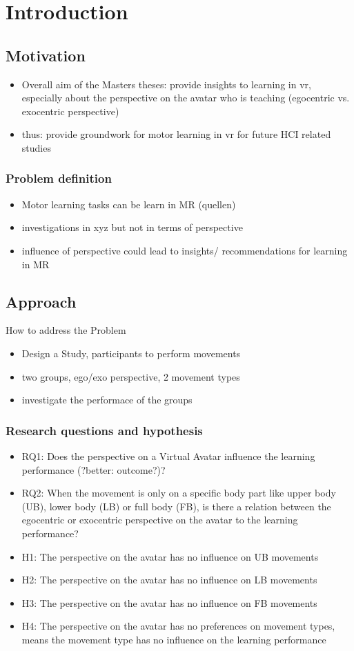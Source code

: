 \chapter{Introduction}
\section{Motivation}
\begin{itemize}
	\item Overall aim of the Masters theses: provide insights to learning in vr, especially about the perspective on the avatar who is teaching (egocentric vs. exocentric perspective)	
	\item thus: provide groundwork for motor learning in vr for future HCI related studies
\end{itemize}
\subsection{Problem definition}
\begin{itemize}
	\item Motor learning tasks can be learn in MR (quellen)
	\item investigations in xyz but not in terms of perspective
	\item influence of perspective could lead to insights/ recommendations for learning in MR
\end{itemize}
\section{Approach}
How to address the Problem
\begin{itemize}
	\item Design a Study, participants to perform movements
	\item two groups, ego/exo perspective, 2 movement types
	\item investigate the performace of the groups
\end{itemize}
\subsection{Research questions and hypothesis}
\begin{itemize}
	\item RQ1: Does the perspective on a Virtual Avatar influence the learning performance (?better: outcome?)?
	\item RQ2: When the movement is only on a specific body part like upper body (UB), lower body (LB) or full body (FB), is there a relation between the egocentric or exocentric perspective on the avatar to the learning performance?
	\item H1: The perspective on the avatar has no influence on UB movements
	\item H2: The perspective on the avatar has no influence on LB movements
	\item H3: The perspective on the avatar has no influence on FB movements
	\item H4: The perspective on the avatar has no preferences on movement types, means the movement type has no influence on the learning performance 
\end{itemize}
	
